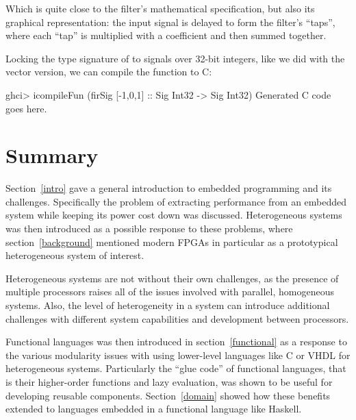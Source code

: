 \documentclass[../main.tex]{subfiles}
\begin{document}
\noindent Which is quite close to the filter's mathematical specification, but also its graphical representation: the input signal is delayed to form the filter's ``taps'', where each ``tap'' is multiplied with a coefficient and then summed together.

Locking the type signature of  to signals over 32-bit integers, like we did with the vector version, we can compile the function to C:

\begin{code}
ghci> icompileFun (firSig [-1,0,1] :: Sig Int32 -> Sig Int32)
Generated C code goes here.
\end{code}

\section{Summary}

Section~\ref{intro} gave a general introduction to embedded programming and its challenges. Specifically the problem of extracting performance from an embedded system while keeping its power cost down was discussed. Heterogeneous systems was then introduced as a possible response to these problems, where section~\ref{background} mentioned modern FPGAs in particular as a prototypical heterogeneous system of interest.

Heterogeneous systems are not without their own challenges, as the presence of multiple processors raises all of the issues involved with parallel, homogeneous systems. Also, the level of heterogeneity in a system can introduce additional challenges with different system capabilities and development between processors.


Functional languages was then introduced in section~\ref{functional} as a response to the various modularity issues with using lower-level languages like C or VHDL for heterogeneous systems. Particularly the ``glue code'' of functional languages, that is their higher-order functions and lazy evaluation, was shown to be useful for developing reusable components. Section~\ref{domain} showed how these benefits extended to languages embedded in a functional language like Haskell.
\end{document}

